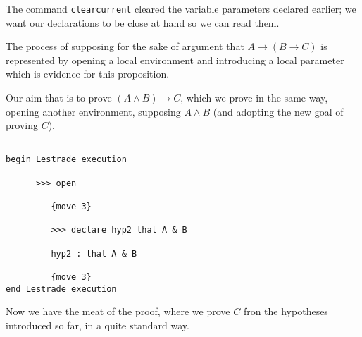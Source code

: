 \documentclass[12pt]{article}
\begin{document}
The command {\tt clearcurrent} cleared the variable parameters declared earlier; we want our declarations to be close at hand so we can read them.

The process of supposing for the sake of argument that $A \rightarrow (B \rightarrow C)$ is represented by
opening a local environment and introducing a local parameter which is evidence for
this proposition.

Our aim that is to prove $(A \wedge B) \rightarrow C$, which we prove in the same way, opening another environment,
supposing $A \wedge B$ (and adopting the new goal of proving $C$).

\begin{verbatim}

begin Lestrade execution

      >>> open

         {move 3}

         >>> declare hyp2 that A & B

         hyp2 : that A & B

         {move 3}
end Lestrade execution

\end{verbatim}

Now we have the meat of the proof, where we prove $C$ fron the hypotheses introduced so far, in a quite
standard way.
\end{document}
